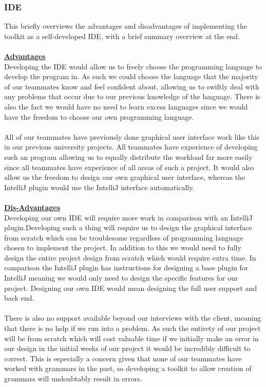 \subsubsection{IDE}
This briefly overviews the advantages and disadvantages of implementing the toolkit as a self-developed IDE, with a brief summary overview at the end.\\
\\
 \textbf {\underline{Advantages}}\\
Developing the IDE would allow us to freely choose the programming language to develop the program in. As such we could choose the language that the majority of our teammates know and feel confident about, allowing us to swiftly deal with any problems that occur due to our previous knowledge of the language. There is also the fact we would have no need to learn excess languages since we would have the freedom to choose our own programming language. \\
\\ 
All of our teammates have previously done graphical user interface work like this in our previous university projects. All teammates have experience of developing such an program allowing us to equally distribute the workload far more easily since all teammates have experience of all areas of such a project. It would also allow us the freedom to design our own graphical user interface, whereas the IntelliJ plugin would use the IntelliJ interface automatically.\\
\\
 \textbf {\underline{Dis-Advantages}}\\
Developing our own IDE will require more work in comparison with an IntelliJ plugin.Developing such a thing will require us to design the graphical interface from scratch which can be troublesome regardless of programming language chosen to implement the project. In addition to this we would need to fully design the entire project design from scratch which would require extra time. In comparison the IntelliJ plugin has instructions for designing a base plugin for IntelliJ meaning we would only need to design the specific features for our project. Designing our own IDE would mean designing the full user support and back end.\\
\\
There is also no support available beyond our interviews with the client, meaning that there is no help if we run into a problem. As such the entirety of our project will be from scratch which will cost valuable time if we initially make an error in our design in the initial weeks of our project it would be incredibly difficult to correct. This is especially a concern given that none of our teammates have worked with grammars in the past, so developing a toolkit to allow creation of grammars will undoubtably result in errors.\\
